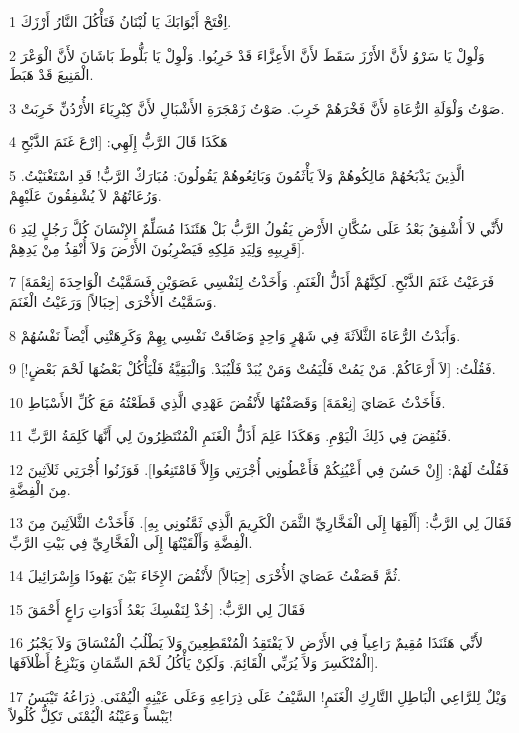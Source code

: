 \par 1 اِفْتَحْ أَبْوَابَكَ يَا لُبْنَانُ فَتَأْكُلَ النَّارُ أَرْزَكَ.
\par 2 وَلْوِلْ يَا سَرْوُ لأَنَّ الأَرْزَ سَقَطَ لأَنَّ الأَعِزَّاءَ قَدْ خَرِبُوا. وَلْوِلْ يَا بَلُّوطَ بَاشَانَ لأَنَّ الْوَعْرَ الْمَنِيعَ قَدْ هَبَطَ.
\par 3 صَوْتُ وَلْوَلَةِ الرُّعَاةِ لأَنَّ فَخْرَهُمْ خَرِبَ. صَوْتُ زَمْجَرَةِ الأَشْبَالِ لأَنَّ كِبْرِيَاءَ الأُرْدُنِّ خَرِبَتْ.
\par 4 هَكَذَا قَالَ الرَّبُّ إِلَهِي: [ارْعَ غَنَمَ الذَّبْحِ
\par 5 الَّذِينَ يَذْبَحُهُمْ مَالِكُوهُمْ وَلاَ يَأْثَمُونَ وَبَائِعُوهُمْ يَقُولُونَ: مُبَارَكٌ الرَّبُّ! قَدِ اسْتَغْنَيْتُ. وَرُعَاتُهُمْ لاَ يُشْفِقُونَ عَلَيْهِمْ.
\par 6 لأَنِّي لاَ أُشْفِقُ بَعْدُ عَلَى سُكَّانِ الأَرْضِ يَقُولُ الرَّبُّ بَلْ هَئَنَذَا مُسَلِّمٌ الإِنْسَانَ كُلَّ رَجُلٍ لِيَدِ قَرِيبِهِ وَلِيَدِ مَلِكِهِ فَيَضْرِبُونَ الأَرْضَ وَلاَ أُنْقِذُ مِنْ يَدِهِمْ].
\par 7 فَرَعَيْتُ غَنَمَ الذَّبْحِ. لَكِنَّهُمْ أَذَلُّ الْغَنَمِ. وَأَخَذْتُ لِنَفْسِي عَصَوَيْنِ فَسَمَّيْتُ الْوَاحِدَةَ [نِعْمَةَ] وَسَمَّيْتُ الأُخْرَى [حِبَالاً] وَرَعَيْتُ الْغَنَمَ.
\par 8 وَأَبَدْتُ الرُّعَاةَ الثَّلاَثَةَ فِي شَهْرٍ وَاحِدٍ وَضَاقَتْ نَفْسِي بِهِمْ وَكَرِهَتْنِي أَيْضاً نَفْسُهُمْ.
\par 9 فَقُلْتُ: [لاَ أَرْعَاكُمْ. مَنْ يَمُتْ فَلْيَمُتْ وَمَنْ يُبَدْ فَلْيُبَدْ. وَالْبَقِيَّةُ فَلْيَأْكُلْ بَعْضُهَا لَحْمَ بَعْضٍ!].
\par 10 فَأَخَذْتُ عَصَايَ [نِعْمَةَ] وَقَصَفْتُهَا لأَنْقُضَ عَهْدِي الَّذِي قَطَعْتُهُ مَعَ كُلِّ الأَسْبَاطِ.
\par 11 فَنُقِضَ فِي ذَلِكَ الْيَوْمِ. وَهَكَذَا عَلِمَ أَذَلُّ الْغَنَمِ الْمُنْتَظِرُونَ لِي أَنَّهَا كَلِمَةُ الرَّبِّ.
\par 12 فَقُلْتُ لَهُمْ: [إِنْ حَسُنَ فِي أَعْيُنِكُمْ فَأَعْطُونِي أُجْرَتِي وَإِلاَّ فَامْتَنِعُوا]. فَوَزَنُوا أُجْرَتِي ثَلاَثِينَ مِنَ الْفِضَّةِ.
\par 13 فَقَالَ لِي الرَّبُّ: [أَلْقِهَا إِلَى الْفَخَّارِيِّ الثَّمَنَ الْكَرِيمَ الَّذِي ثَمَّنُونِي بِهِ]. فَأَخَذْتُ الثَّلاَثِينَ مِنَ الْفِضَّةِ وَأَلْقَيْتُهَا إِلَى الْفَخَّارِيِّ فِي بَيْتِ الرَّبِّ.
\par 14 ثُمَّ قَصَفْتُ عَصَايَ الأُخْرَى [حِبَالاً] لأَنْقُضَ الإِخَاءَ بَيْنَ يَهُوذَا وَإِسْرَائِيلَ.
\par 15 فَقَالَ لِي الرَّبُّ: [خُذْ لِنَفْسِكَ بَعْدُ أَدَوَاتِ رَاعٍ أَحْمَقَ
\par 16 لأَنِّي هَئَنَذَا مُقِيمٌ رَاعِياً فِي الأَرْضِ لاَ يَفْتَقِدُ الْمُنْقَطِعِينَ وَلاَ يَطْلُبُ الْمُنْسَاقَ وَلاَ يَجْبُرُ الْمُنْكَسِرَ وَلاَ يُرَبِّي الْقَائِمَ. وَلَكِنْ يَأْكُلُ لَحْمَ السِّمَانِ وَيَنْزِعُ أَظْلاَفَهَا].
\par 17 وَيْلٌ لِلرَّاعِي الْبَاطِلِ التَّارِكِ الْغَنَمِ! السَّيْفُ عَلَى ذِرَاعِهِ وَعَلَى عَيْنِهِ الْيُمْنَى. ذِرَاعُهُ تَيْبَسُ يَبْساً وَعَيْنُهُ الْيُمْنَى تَكِلُّ كُلُولاً!

